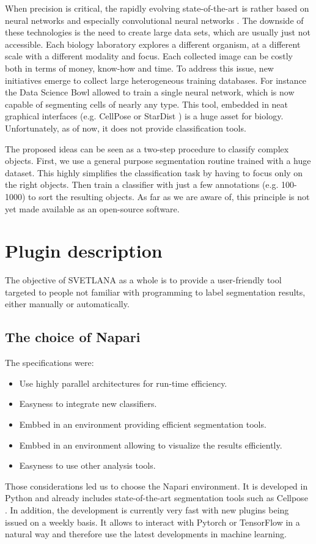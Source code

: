 \documentclass{article}
\begin{document}
When precision is critical, the rapidly evolving state-of-the-art is rather based on neural networks and especially convolutional neural networks \cite{dhillon2020convolutional,8237584}. The downside of these technologies is the need to create large data sets, which are usually just not accessible. Each biology laboratory explores a different organism, at a different scale with a different modality and focus. Each collected image can be costly both in terms of money, know-how and time. To address this issue, new initiatives emerge to collect large heterogeneous training databases. For instance the Data Science Bowl \cite{caicedo2019nucleus} allowed to train a single neural network, which is now capable of segmenting cells of nearly any type. This tool, embedded in neat graphical interfaces (e.g. CellPose \cite{stringer2021cellpose} or StarDist \cite{fazeli2020automated}) is a huge asset for biology. Unfortunately, as of now, it does not provide classification tools.

The proposed ideas can be seen as a two-step procedure to classify complex objects. First, we use a general purpose segmentation routine trained with a huge dataset. This highly simplifies the classification task by having to focus only on the right objects. Then train a classifier with just a few annotations (e.g. 100-1000) to sort the resulting objects. As far as we are aware of, this principle is not yet made available as an open-source software.

\section{Plugin description}
\label{sec:format}

The objective of SVETLANA as a whole is to provide a user-friendly tool targeted to people not familiar with programming to label segmentation results, either manually or automatically. 

\subsection{The choice of Napari}
The specifications were:
\begin{itemize}
  \setlength{\itemsep}{3pt}%
  \setlength{\parskip}{0pt}%
  \item Use highly parallel architectures for run-time efficiency.
  \item Easyness to integrate new classifiers.
  \item Embbed in an environment providing efficient segmentation tools.
  \item Embbed in an environment allowing to visualize the results efficiently.
  \item Easyness to use other analysis tools.
\end{itemize}
Those considerations led us to choose the Napari environment. 
It is developed in Python and already includes state-of-the-art segmentation tools such as Cellpose \cite{stringer2021cellpose}. 
In addition, the development is currently very fast with new plugins being issued on a weekly basis.
It allows to interact with Pytorch or TensorFlow in a natural way and therefore use the latest developments in machine learning.
\end{document}
